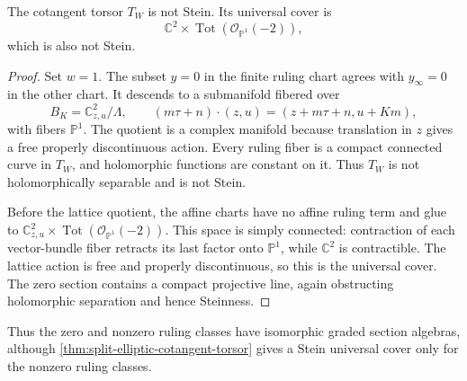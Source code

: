 \begin{proposition}\label{prop:elliptic-zero-ruling-torsor-cover}
The cotangent torsor $T_W$ is not Stein. Its universal cover is
\[
 \mathbb C^2\times\operatorname{Tot}
                      (\mathcal O_{\mathbb P^1}(-2)),
\]
which is also not Stein.
\end{proposition}
\begin{proof}
Set $w=1$. The subset $y=0$ in the finite ruling chart agrees with $y_\infty=0$ in the other chart. It descends to a submanifold fibered over
\[
 B_K=\mathbb C^2_{z,u}/\Lambda,\qquad
 (m\tau+n)\cdot(z,u)=(z+m\tau+n,u+Km),
\]
with fibers $\mathbb P^1$. The quotient is a complex manifold because translation in $z$ gives a free properly discontinuous action. Every ruling fiber is a compact connected curve in $T_W$, and holomorphic functions are constant on it. Thus $T_W$ is not holomorphically separable and is not Stein.

Before the lattice quotient, the affine charts have no affine ruling term and glue to $\mathbb C^2_{z,u}\times\operatorname{Tot}(\mathcal O_{\mathbb P^1}(-2))$. This space is simply connected: contraction of each vector-bundle fiber retracts its last factor onto $\mathbb P^1$, while $\mathbb C^2$ is contractible. The lattice action is free and properly discontinuous, so this is the universal cover. The zero section contains a compact projective line, again obstructing holomorphic separation and hence Steinness.
\end{proof}

Thus the zero and nonzero ruling classes have isomorphic graded section algebras, although \cref{thm:split-elliptic-cotangent-torsor} gives a Stein universal cover only for the nonzero ruling classes.
